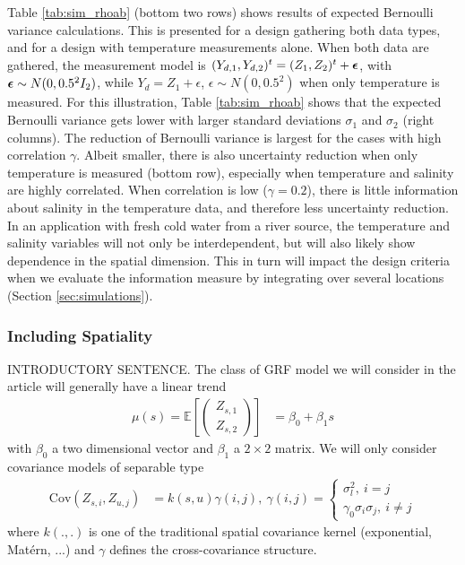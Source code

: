 \documentclass[aoas]{imsart}
\begin{document}
Table \ref{tab:sim_rhoab} (bottom two rows) shows results of expected
Bernoulli variance calculations. This is presented for a design
gathering both data types, and for a design with temperature
measurements alone. When both data are gathered, the measurement model is
$(Y_{d,1},Y_{d,2})^t=(Z_1,Z_2)^t+{\boldsymbol \epsilon}$, with ${\boldsymbol \epsilon} \sim N(0,0.5^2I_2)$, while $Y_d=Z_1+\epsilon$, $\epsilon \sim N(0,0.5^2)$ when only temperature is measured.
For this illustration, Table \ref{tab:sim_rhoab} shows that the
expected Bernoulli variance gets lower with larger standard deviations
$\sigma_1$ and $\sigma_2$ (right columns). The reduction of Bernoulli
variance is largest for the cases with high correlation
$\gamma$. Albeit smaller, there is also uncertainty reduction when
only temperature is measured (bottom row), especially when temperature
and salinity are highly correlated. When correlation is low
($\gamma=0.2$), there is little information about salinity in the
temperature data, and therefore less uncertainty reduction. In an
application with fresh cold water from a river source, the temperature
and salinity variables will not only be interdependent, but will also
likely show dependence in the spatial dimension. This in turn will
impact the design criteria when we evaluate the information measure by
integrating over several locations (Section \ref{sec:simulations}).

\subsubsection{Including Spatiality}
INTRODUCTORY SENTENCE.
The class of GRF model we will consider in the article will generally have a linear trend
\begin{align*}
\mu(s)=\mathbb{E}\left[\begin{pmatrix}
Z_{s, 1}\\ Z_{s, 2}
\end{pmatrix}\right] &= \beta_0 + \beta_1 s
\end{align*}
with $\beta_0$ a two dimensional vector and $\beta_1$ a $2\times 2$ matrix. We will only consider covariance models of separable type
\begin{align*}
\textrm{Cov}\left(Z_{s, i}, Z_{u, j}\right) &= k(s, u) \gamma(i, j),~ \gamma(i, j) = \begin{cases} \sigma_l^2,~ i=j\\
   \gamma_0 \sigma_i \sigma_j,~i\neq j
        \end{cases}
\end{align*}
where $k(., .)$ is one of the traditional spatial covariance kernel (exponential, Mat\'{e}rn, ...) and $\gamma$ defines the cross-covariance structure.
\end{document}
